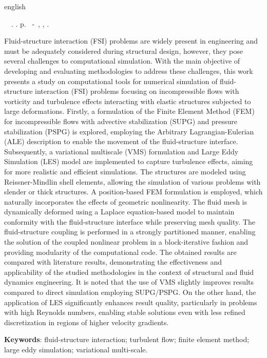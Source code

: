 \begin{resumo}[Abstract]
	\begin{otherlanguage*}{english}
		\begin{flushleft}
			\setlength{\absparsep}{0pt} %
			\SingleSpacing  		\imprimirautorabr~~\textbf{\imprimirtitleabstract}.	\imprimirdata.  \pageref{LastPage} p.
			\imprimirtipotrabalhoabs~-~\imprimirinstituicao, \imprimirlocal, 	\imprimirdata.
		\end{flushleft}
		\OnehalfSpacing

		Fluid-structure interaction (FSI) problems are widely present in engineering and must be adequately considered during structural design, however, they pose several challenges to computational simulation. With the main objective of developing and evaluating methodologies to address these challenges, this work presents a study on computational tools for numerical simulation of fluid-structure interaction (FSI) problems focusing on incompressible flows with vorticity and turbulence effects interacting with elastic structures subjected to large deformations. Firstly, a formulation of the Finite Element Method (FEM) for incompressible flows with advective stabilization (SUPG) and pressure stabilization (PSPG) is explored, employing the Arbitrary Lagrangian-Eulerian (ALE) description to enable the movement of the fluid-structure interface. Subsequently, a variational multiscale (VMS) formulation and Large Eddy Simulation (LES) model are implemented to capture turbulence effects, aiming for more realistic and efficient simulations. The structures are modeled using Reissner-Mindlin shell elements, allowing the simulation of various problems with slender or thick structures. A position-based FEM formulation is employed, which naturally incorporates the effects of geometric nonlinearity. The fluid mesh is dynamically deformed using a Laplace equation-based model to maintain conformity with the fluid-structure interface while preserving mesh quality. The fluid-structure coupling is performed in a strongly partitioned manner, enabling the solution of the coupled nonlinear problem in a block-iterative fashion and providing modularity of the computational code. The obtained results are compared with literature results, demonstrating the effectiveness and applicability of the studied methodologies in the context of structural and fluid dynamics engineering. It is noted that the use of VMS slightly improves results compared to direct simulation employing SUPG/PSPG. On the other hand, the application of LES significantly enhances result quality, particularly in problems with high Reynolds numbers, enabling stable solutions even with less refined discretization in regions of higher velocity gradients.		\vspace{\onelineskip}

		\noindent
		\textbf{Keywords}: fluid-structure interaction; turbulent flow; finite element method; large eddy simulation; variational multi-scale.
	\end{otherlanguage*}
\end{resumo}
